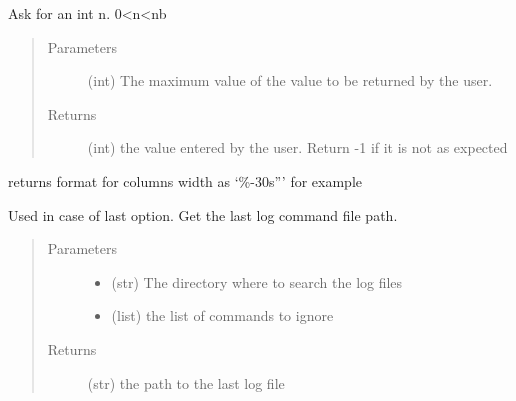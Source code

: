 \documentclass[a4paper,10pt,english]{sphinxmanual}
\begin{document}
\begin{fulllineitems}
\label{\detokenize{apidoc_commands/commands:commands.log.ask_value}}
Ask for an int n. 0\textless{}n\textless{}nb
\begin{quote}\begin{description}
\item[{Parameters}] \leavevmode
{} \textendash{} (int) The maximum value of the value to be returned by the user.

\item[{Returns}] \leavevmode
(int) 
the value entered by the user. Return -1 if it is not as expected

\end{description}\end{quote}

\end{fulllineitems}


\begin{fulllineitems}
\label{\detokenize{apidoc_commands/commands:commands.log.getMaxFormat}}
returns format for columns width as ‘\%-30s”’ for example

\end{fulllineitems}


\begin{fulllineitems}
\label{\detokenize{apidoc_commands/commands:commands.log.get_last_log_file}}
Used in case of last option. 
Get the last log command file path.
\begin{quote}\begin{description}
\item[{Parameters}] \leavevmode\begin{itemize}
\item {} 
 \textendash{} (str) The directory where to search the log files

\item {} 
 \textendash{} (list) the list of commands to ignore

\end{itemize}

\item[{Returns}] \leavevmode
(str) the path to the last log file

\end{description}\end{quote}

\end{fulllineitems}
\end{document}
